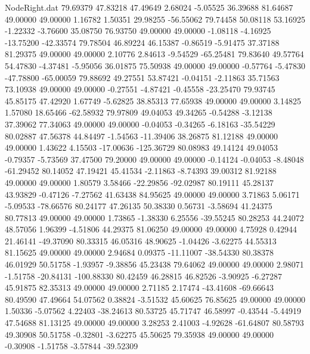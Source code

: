 \begin{filecontents}{NodeRight.dat}
  79.69379   47.83218   47.49649     2.68024   -5.05525   36.39688   81.64687   49.00000   49.00000    1.16782    1.50351   29.98255  -56.55062
  79.74458   50.08118   53.16925    -1.22332   -3.76600   35.08750   76.93750   49.00000   49.00000   -1.08118   -4.16925  -13.75200  -42.33574
  79.78504   46.89224   46.15387    -0.86519   -5.91475   37.37188   81.29375   49.00000   49.00000    2.10776    2.84613   -9.54529  -65.25481
  79.83640   49.57764   54.47830    -4.37481   -5.95056   36.01875   75.50938   49.00000   49.00000   -0.57764   -5.47830  -47.78800  -65.00059
  79.88692   49.27551   53.87421    -0.04151   -2.11863   35.71563   73.10938   49.00000   49.00000   -0.27551   -4.87421   -0.45558  -23.25470
  79.93745   45.85175   47.42920     1.67749   -5.62825   38.85313   77.65938   49.00000   49.00000    3.14825    1.57080   18.65466  -62.58932
  79.97809   49.04053   49.34265    -0.54288   -3.12138   37.39062   77.34063   49.00000   49.00000   -0.04053   -0.34265   -6.18163  -35.54229
  80.02887   47.56378   44.84497    -1.54563  -11.39406   38.26875   81.12188   49.00000   49.00000    1.43622    4.15503  -17.00636 -125.36729
  80.08983   49.14124   49.04053    -0.79357   -5.73569   37.47500   79.20000   49.00000   49.00000   -0.14124   -0.04053   -8.48048  -61.29452
  80.14052   47.19421   45.41534    -2.11863   -8.74393   39.00312   81.92188   49.00000   49.00000    1.80579    3.58466  -22.29856  -92.02987
  80.19111   45.28137   43.93829    -0.47126   -7.27562   41.63438   84.95625   49.00000   49.00000    3.71863    5.06171   -5.09533  -78.66576
  80.24177   47.26135   50.38330     0.56731   -3.58694   41.24375   80.77813   49.00000   49.00000    1.73865   -1.38330    6.25556  -39.55245
  80.28253   44.24072   48.57056     1.96399   -4.51806   44.29375   81.06250   49.00000   49.00000    4.75928    0.42944   21.46141  -49.37090
  80.33315   46.05316   48.90625    -1.04426   -3.62275   44.55313   81.15625   49.00000   49.00000    2.94684    0.09375  -11.11007  -38.54330
  80.38378   46.01929   50.51758    -1.93957   -9.38856   45.23438   79.64062   49.00000   49.00000    2.98071   -1.51758  -20.84131 -100.88330
  80.42459   46.28815   46.82526    -3.90925   -6.27287   45.91875   82.35313   49.00000   49.00000    2.71185    2.17474  -43.41608  -69.66643
  80.49590   47.49664   54.07562     0.38824   -3.51532   45.60625   76.85625   49.00000   49.00000    1.50336   -5.07562    4.22403  -38.24613
  80.53725   45.71747   46.58997    -0.43544   -5.44919   47.54688   81.13125   49.00000   49.00000    3.28253    2.41003   -4.92628  -61.64807
  80.58793   49.30908   50.51758    -0.32801   -3.62275   45.50625   79.35938   49.00000   49.00000   -0.30908   -1.51758   -3.57844  -39.52309

\end{filecontents}
